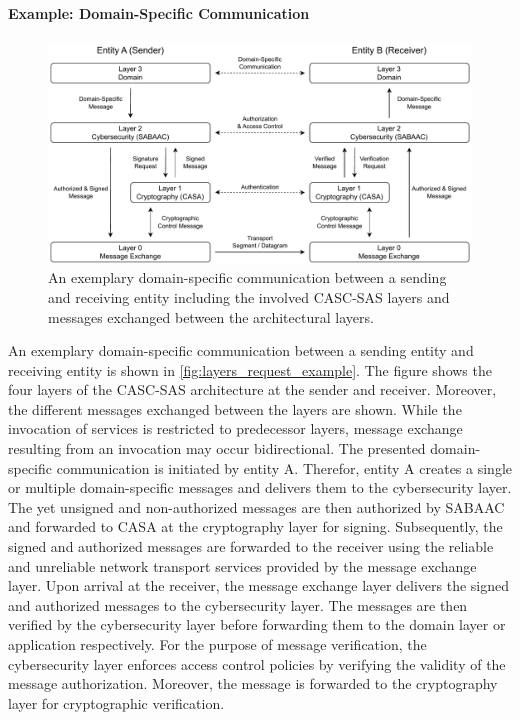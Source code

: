 \paragraph{Example: Domain-Specific Communication}
\begin{figure}
    \centering
    \includegraphics[width=1.0\linewidth]{figures/layers_request_example.drawio.pdf}
    \caption{An exemplary domain-specific communication between a sending and receiving entity including the involved CASC-SAS layers and messages exchanged between the architectural layers.}
    \label{fig:layers_request_example}
\end{figure}
An exemplary domain-specific communication between a sending entity and receiving entity is shown in \autoref{fig:layers_request_example}.
The figure shows the four layers of the CASC-SAS architecture at the sender and receiver.
Moreover, the different messages exchanged between the layers are shown.
While the invocation of services is restricted to predecessor layers, message exchange resulting from an invocation may occur bidirectional.
The presented domain-specific communication is initiated by entity A.
Therefor, entity A creates a single or multiple domain-specific messages and delivers them to the cybersecurity layer.
The yet unsigned and non-authorized messages are then authorized by SABAAC and forwarded to CASA at the cryptography layer for signing.
Subsequently, the signed and authorized messages are forwarded to the receiver using the reliable and unreliable network transport services provided by the message exchange layer.
Upon arrival at the receiver, the message exchange layer delivers the signed and authorized messages to the cybersecurity layer.
The messages are then verified by the cybersecurity layer before forwarding them to the domain layer or application respectively.
For the purpose of message verification, the cybersecurity layer enforces access control policies by verifying the validity of the message authorization.
Moreover, the message is forwarded to the cryptography layer for cryptographic verification.

